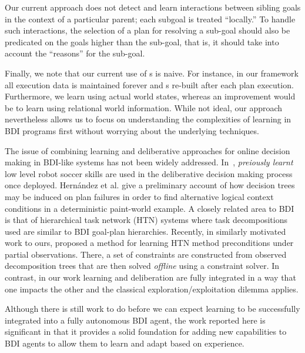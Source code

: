 %
Our current approach does not detect and learn interactions between
sibling goals in the context of a particular parent; each
subgoal is treated ``locally.'' To handle such interactions, the
selection of a plan for resolving a sub-goal should also be predicated
on the goals higher than the sub-goal, that is, it should take into
account the ``reasons'' for the sub-goal.


Finally, we note that our current use of \dt s is naive. 
For instance, in our framework all execution data is maintained forever and 
\dt s re-built after each plan execution. Furthermore, we learn using actual 
world states, whereas an improvement would be to learn using relational world information.
While not ideal, our approach nevertheless allows us to focus on 
understanding the complexities of learning in BDI programs first 
without worrying about the underlying techniques.

The issue of combining learning and deliberative approaches for online 
decision making in BDI-like systems has not been widely addressed.
In~\cite{Riedmiller01}, \textit{preiously learnt} low level robot soccer skills are 
used in the deliberative decision making process once deployed.
Hern\'andez et al. \cite{Hernandez04:Learning} give a preliminary
account of how decision trees may be induced on plan failures in order
to find alternative logical context conditions in a deterministic
paint-world example. 
A closely related area to BDI is that of hierarchical task network (HTN)
systems where task decompositions used are similar to BDI goal-plan hierarchies.
Recently, in similarly motivated work to ours, \cite{Zhuo09:Learning} 
proposed a method for learning HTN method preconditions under partial
observations. There, a set of constraints are constructed from
observed decomposition trees that are then solved \emph{offline} using
a constraint solver.
In contrast, in our work learning and deliberation are fully integrated in a
way that one impacts the other and the classical
exploration/exploitation dilemma applies. 

Although there is still work to do before we can expect learning to be
successfully integrated into a fully autonomous BDI agent, the
work reported here is significant in that it provides a solid
foundation for adding new capabilities to BDI agents to allow them to
learn and adapt based on experience.

